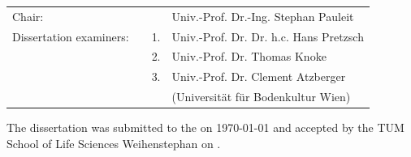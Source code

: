 \begin{titlepage}
\begin{addmargin}[-1.5cm]{-1.5cm}
\begin{center} 
   \begin{tabular}{llll}
	Chair: 				   & &    & Univ.-Prof. Dr.-Ing. Stephan Pauleit\\[4mm]                                            
    Dissertation examiners:& & 1. & Univ.-Prof. Dr. Dr. h.c. Hans Pretzsch\\[2mm]
                           & & 2. & Univ.-Prof. Dr. Thomas Knoke\\[2mm]
                           & & 3. & Univ.-Prof. Dr. Clement Atzberger \\
                           & &    & (Universität für Bodenkultur Wien) \\
  \end{tabular}
\end{center}


							
							
\bigskip
\bigskip
\bigskip

\noindent\large{The dissertation was submitted to the \myUni on \today{} and accepted by the TUM School of Life Sciences Weihenstephan on \underline{}	.}


\end{addmargin}



\end{titlepage}

